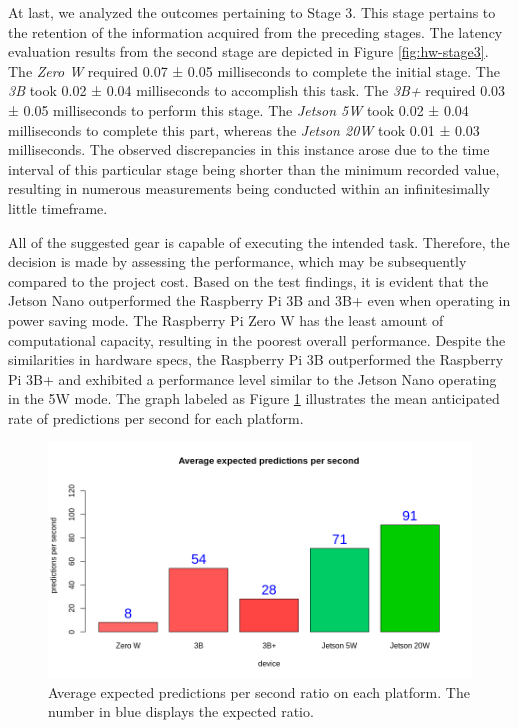 At last, we analyzed the outcomes pertaining to Stage 3. This stage pertains to the retention of the information acquired from the preceding stages. The latency evaluation results from the second stage are depicted in Figure \ref{fig:hw-stage3}. The \textit{Zero W} required 0.07 ± 0.05 milliseconds to complete the initial stage. The \textit{3B} took 0.02 ± 0.04 milliseconds to accomplish this task. The \textit{3B+} required 0.03 ± 0.05 milliseconds to perform this stage. The \textit{Jetson 5W} took 0.02 ± 0.04 milliseconds to complete this part, whereas the \textit{Jetson 20W} took 0.01 ± 0.03 milliseconds. The observed discrepancies in this instance arose due to the time interval of this particular stage being shorter than the minimum recorded value, resulting in numerous measurements being conducted within an infinitesimally little timeframe.

All of the suggested gear is capable of executing the intended task. Therefore, the decision is made by assessing the performance, which may be subsequently compared to the project cost. Based on the test findings, it is evident that the Jetson Nano outperformed the Raspberry Pi 3B and 3B+ even when operating in power saving mode. The Raspberry Pi Zero W has the least amount of computational capacity, resulting in the poorest overall performance. Despite the similarities in hardware specs, the Raspberry Pi 3B outperformed the Raspberry Pi 3B+ and exhibited a performance level similar to the Jetson Nano operating in the 5W mode. The graph labeled as Figure \ref{fig:predpersec} illustrates the mean anticipated rate of predictions per second for each platform.

\begin{figure}[h]
    \centering
    \includegraphics[width = .8\linewidth]{Figures/predpersec.png}
    \caption{Average expected predictions per second ratio on each platform. The number in blue displays the expected ratio.}
    \label{fig:predpersec}
\end{figure}

